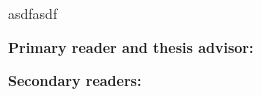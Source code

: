 
asdfasdf


\begin{singlespace}

\textbf{Primary reader and thesis advisor:}

\vspace{0.2in}

\textbf{Secondary readers: }


\vspace{0.1in}

\end{singlespace}